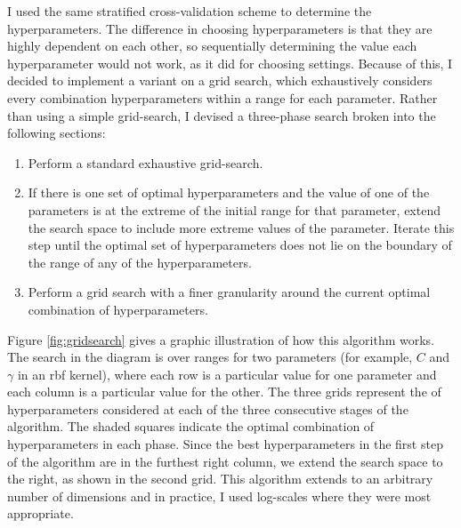 \documentclass[12pt,a4paper,twoside,openright]{report}
\begin{document}
I used the same stratified cross-validation scheme to determine the hyperparameters. The difference in choosing hyperparameters is that they are highly dependent on each other, so sequentially determining the value each hyperparameter would not work, as it did for choosing settings. Because of this, I decided to implement a variant on a grid search, which exhaustively considers every combination hyperparameters within a range for each parameter. Rather than using a simple grid-search, I devised a three-phase search broken into the following sections:
\begin{enumerate}
	\item Perform a standard exhaustive grid-search.
	\item If there is one set of optimal hyperparameters and the value of one of the parameters is at the extreme of the initial range for that parameter, extend the search space to include more extreme values of the parameter. Iterate this step until the optimal set of hyperparameters does not lie on the boundary of the range of any of the hyperparameters.
	\item Perform a grid search with a finer granularity around the current optimal combination of hyperparameters.
\end{enumerate}
Figure \ref{fig:gridsearch} gives a graphic illustration of how this algorithm works. The search in the diagram is over ranges for two parameters (for example, $C$ and $\gamma$ in an rbf kernel), where each row is a particular value for one parameter and each column is a particular value for the other. The three grids represent the of hyperparameters considered at each of the three consecutive stages of the algorithm. The shaded squares indicate the optimal combination of hyperparameters in each phase. Since the best hyperparameters in the first step of the algorithm are in the furthest right column, we extend the search space to the right, as shown in the second grid. This algorithm extends to an arbitrary number of dimensions and in practice, I used log-scales where they were most appropriate.
\end{document}
